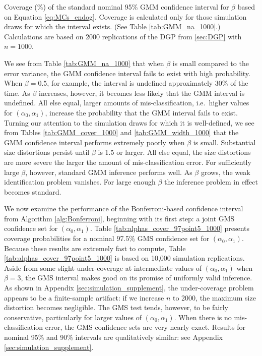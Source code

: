 \begin{table}[htbp]
  \small
  \centering
  
  \caption{Coverage (\%) of the standard nominal 95\% GMM confidence interval for $\beta$ based on Equation \ref{eq:MCs_endog}. Coverage is calculated only for those simulation draws for which the interval exists. (See Table \ref{tab:GMM_na_1000}.) Calculations are based on 2000 replications of the DGP from \ref{sec:DGP} with $n = 1000$.} 
  \label{tab:GMM_cover_1000}
\end{table}


We see from Table \ref{tab:GMM_na_1000} that when $\beta$ is small compared to the error variance, the GMM confidence interval fails to exist with high probability.
When $\beta = 0.5$, for example, the interval is undefined approximately 30\% of the time.
As $\beta$ increases, however, it becomes less likely that the GMM interval is undefined.
All else equal, larger amounts of mis-classification, i.e.\ higher values for $(\alpha_0, \alpha_1)$, increase the probability that the GMM interval fails to exist.
Turning our attention to the simulation draws for which it is well-defined, we see from Tables \ref{tab:GMM_cover_1000} and \ref{tab:GMM_width_1000} that the GMM confidence interval performs extremely poorly when $\beta$ is small.
Substantial size distortions persist until $\beta$ is 1.5 or larger.
All else equal, the size distortions are more severe the larger the amount of mis-classification error.
For sufficiently large $\beta$, however, standard GMM inference performs well.
As $\beta$ grows, the weak identification problem vanishes.
For large enough $\beta$ the inference problem in effect becomes standard.

We now examine the performance of the Bonferroni-based confidence interval from Algorithm \ref{alg:Bonferroni}, beginning with its first step: a joint GMS confidence set for $(\alpha_0, \alpha_1)$.
Table \ref{tab:alphas_cover_97point5_1000} presents coverage probabilities for a nominal 97.5\% GMS confidence set for $(\alpha_0, \alpha_1)$.
Because these results are extremely fast to compute, Table \ref{tab:alphas_cover_97point5_1000} is based on 10,000 simulation replications. 
Aside from some slight under-coverage at intermediate values of $(\alpha_0, \alpha_1)$ when $\beta = 3$, the GMS interval makes good on its promise of uniformly valid inference.
As shown in Appendix \ref{sec:simulation_supplement}, the under-coverage problem appears to be a finite-sample artifact: if we increase $n$ to 2000, the maximum size distortion becomes negligible.
The GMS test tends, however, to be fairly conservative, particularly for larger values of $(\alpha_0, \alpha_1)$.
When there is no mis-classification error, the GMS confidence sets are very nearly exact.
Results for nominal 95\% and 90\% intervals are qualitatively similar: see Appendix \ref{sec:simulation_supplement}.

